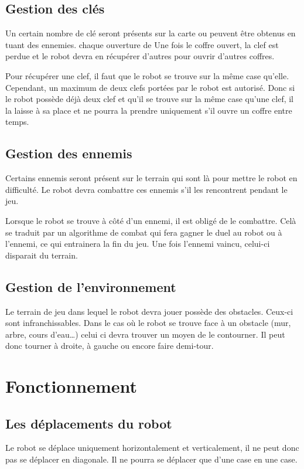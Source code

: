 \documentclass[a4paper 12pts]{article}
\begin{document}

\subsection{Gestion des clés}


Un certain nombre de clé seront présents sur la carte ou peuvent être obtenus en tuant des ennemies.
chaque ouverture de 
Une fois le coffre ouvert, la clef est perdue et le robot devra en récupérer d'autres pour ouvrir d'autres coffres.

Pour récupérer une clef, il faut que le robot se trouve sur la même case qu'elle. Cependant, un maximum de deux clefs portées par le robot est autorisé. Donc si le robot possède déjà deux clef et qu'il se trouve sur la même case qu'une clef, il la laisse à sa place et ne pourra la prendre uniquement s'il ouvre un coffre entre temps.

\subsection{Gestion des ennemis}
Certains ennemis seront présent sur le terrain qui sont là pour mettre le robot en difficulté. Le robot devra combattre ces ennemis s'il les rencontrent pendant le jeu.

Lorsque le robot se trouve à côté d'un ennemi, il est obligé de le combattre. Celà se traduit par un algorithme de combat qui fera gagner le duel au robot ou à l'ennemi, ce qui entrainera la fin du jeu. Une fois l'ennemi vaincu, celui-ci disparait du terrain.

\subsection{Gestion de l'environnement}
Le terrain de jeu dans lequel le robot devra jouer possède des obstacles. Ceux-ci sont infranchissables. Dans le cas où le robot se trouve face à un obstacle (mur, arbre, cours d'eau\ldots) celui ci devra trouver un moyen de le contourner. Il peut donc tourner à droite, à gauche ou encore faire demi-tour.


\section{Fonctionnement}

\subsection{Les déplacements du robot}
Le robot se déplace uniquement horizontalement et verticalement, il ne peut donc pas se déplacer en diagonale. Il ne pourra se déplacer que d'une case en une case.
\end{document}
